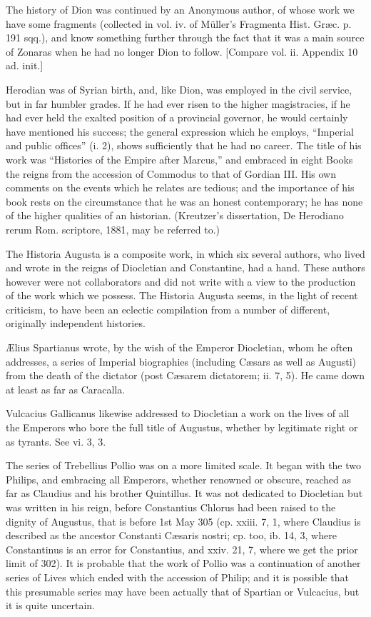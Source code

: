 The history of Dion was continued by an Anonymous author, of whose work we have some fragments (collected in vol. iv. of Müller\texthebrew{}’s Fragmenta Hist. Græc. p. 191 sqq.), and know something further through the fact that it was a main source of Zonaras when he had no longer Dion to follow. [Compare vol. ii. Appendix 10 ad. init.]

Herodian was of Syrian birth, and, like Dion, was employed in the civil service, but in far humbler grades. If he had ever risen to the higher magistracies, if he had ever held the exalted position of a provincial governor, he would certainly have mentioned his success; the general expression which he employs, \texthebrew{“}Imperial and public offices\texthebrew{}” (i. 2), shows sufficiently that he had no career. The title of his work was \texthebrew{“}Histories of the Empire after Marcus,\texthebrew{}” and embraced in eight Books the reigns from the accession of Commodus to that of Gordian III. His own comments on the events which he relates are tedious; and the importance of his book rests on the circumstance that he was an honest contemporary; he has none of the higher qualities of an historian. (Kreutzer\texthebrew{}’s dissertation, De Herodiano rerum Rom. scriptore, 1881, may be referred to.)

The Historia Augusta is a composite work, in which six several authors, who lived and wrote in the reigns of Diocletian and Constantine, had a hand. These authors however were not collaborators and did not write with a view to the production of the work which we possess. The Historia Augusta seems, in the light of recent criticism, to have been an eclectic compilation from a number of different, originally independent histories.

Ælius Spartianus wrote, by the wish of the Emperor Diocletian, whom he often addresses, a series of Imperial biographies (including Cæsars as well as Augusti) from the death of the dictator (post Cæsarem dictatorem; ii. 7, 5). He came down at least as far as Caracalla.

Vulcacius Gallicanus likewise addressed to Diocletian a work on the lives of all the Emperors who bore the full title of Augustus, whether by legitimate right or as tyrants. See vi. 3, 3.

The series of Trebellius Pollio was on a more limited scale. It began with the two Philips, and embracing all Emperors, whether renowned or obscure, reached as far as Claudius and his brother Quintillus. It was not dedicated to Diocletian but was written in his reign, before Constantius Chlorus had been raised to the dignity of Augustus, that is before 1st May 305 (cp. xxiii. 7, 1, where Claudius is described as the ancestor Constanti Cæsaris nostri; cp. too, ib. 14, 3, where Constantinus is an error for Constantius, and xxiv. 21, 7, where we get the prior limit of 302). It is probable that the work of Pollio was a continuation of another series of Lives which ended with the accession of Philip; and it is possible that this presumable series may have been actually that of Spartian or Vulcacius, but it is quite uncertain.

